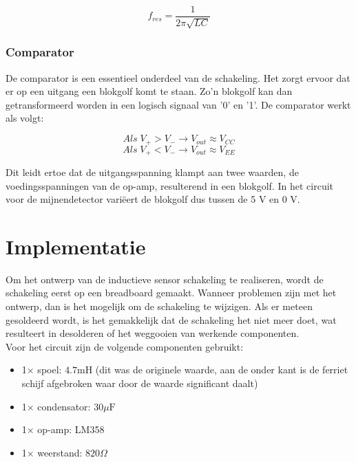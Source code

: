 \documentclass{report}
\begin{document}
\begin{equation}
f_{res}=\frac{1}{2\pi\sqrt{LC}}
\end{equation}

\subsubsection{Comparator}
De comparator is een essentieel onderdeel van de schakeling. Het zorgt ervoor dat er op een uitgang een blokgolf komt te staan. Zo'n blokgolf kan dan getransformeerd worden in een logisch signaal van '0' en '1'. De comparator werkt als volgt:

\begin{equation}
Als \;V_+ > V_- \rightarrow V_{out}\approx V_{CC}
\end{equation}
\begin{equation}
Als \; V_+ < V_- \rightarrow V_{out}\approx V_{EE}
\end{equation}

\noindent
Dit leidt ertoe dat de uitgangsspanning klampt aan twee waarden, de voedingsspanningen van de op-amp, resulterend in een blokgolf. In het circuit voor de mijnendetector variëert de blokgolf dus tussen de 5 V en 0 V.\\

\section{Implementatie}
Om het ontwerp van de inductieve sensor schakeling te realiseren, wordt de schakeling eerst op een breadboard gemaakt. Wanneer problemen zijn met het ontwerp, dan is het mogelijk om de schakeling te wijzigen. Als er meteen gesoldeerd wordt, is het gemakkelijk dat de schakeling het niet meer doet, wat resulteert in desolderen of het weggooien van werkende componenten.\\ 

\noindent Voor het circuit zijn de volgende componenten gebruikt:
\begin{itemize}
\item 1$\times$ spoel: $4.7 \mathrm{mH}$ (dit was de originele waarde, aan de onder kant is de ferriet schijf afgebroken waar door de waarde significant daalt)
\item 1$\times$ condensator: $30 \mu \mathrm{F}$
\item 1$\times$ op-amp: LM358
\item 1$\times$ weerstand: $820 \Omega$
\end{itemize}
\end{document}
